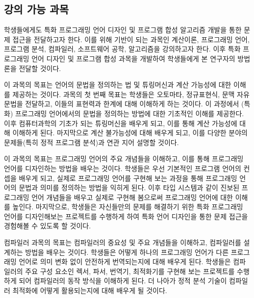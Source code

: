 \documentclass[11pt]{article}
\newcommand{\myparagraph}[1]{\medskip\noindent{\it \textbf{#1.}}}
\begin{document}
\begin{spacing}{1.145}
\section{강의 가능 과목}
학생들에게도 특화 프로그래밍 언어 디자인 및 프로그램 합성 알고리즘 개발을 통한 문제 접근을 전달하고자 한다.
%
이를 위해 기반이 되는 과목인 계산이론, 프로그래밍 언어, 프로그램 분석, 컴파일러, 소프트웨어 공학, 알고리즘을 강의하고자 한다.
%
이후 특화 프로그래밍 언어 디자인 및 프로그램 합성 과목을 개발하여 학생들에게 본 연구자의 방법론을 전달할 것이다.



\myparagraph{계산이론} 
%
이 과목의 목표는 언어의 문법을 정의하는 법 및 튜링머신과 계산 가능성에 대한 이해를 제공하는 것이다. 
%
과목의 첫 번째 목표는 학생들은 오토마타, 정규표현식, 문맥 자유 문법을 전달하고, 이들의 표현력과 한계에 대해 이해하게 하는 것이다.
%
이 과정에서 (특화) 프로그래밍 언어에서의 문법을 정의하는 방법에 대한 기초적인 이해를 제공한다.
%
이후 컴퓨터과학의 기초가 되는 튜링머신을 배우게 되고, 이를 통해 계산 가능성에 대해 이해하게 된다.
%
마지막으로 계산 불가능성에 대해 배우게 되고, 이를 다양한 분야의 문제들(특히 정적 프로그램 분석)과 연관 지어 설명할 것이다.



\myparagraph{프로그래밍 언어}
%
이 과목의 목표는 프로그래밍 언어의 주요 개념들을 이해하고, 이를 통해 프로그래밍 언어를 디자인하는 방법을 배우는 것이다.
%
학생들은 우선 기본적인 프로그램 언어의 컨셉을 배우게 되고, 실제로 프로그래밍 언어를 구현해 보는 과정을 통해 프로그래밍 언어의 문법과 의미를 정의하는 방법을 익히게 된다.
%
이후 타입 시스템과 같이 진보된 프로그래밍 언어 개념들을 배우고 실제로 구현해 봄으로써 프로그래밍 언어에 대한 이해를 높인다.
%
마지막으로, 학생들은 자신들만의 문제를 해결하기 위한 특화 프로그래밍 언어를 디자인해보는 프로젝트를 수행하게 하여 특화 언어 디자인을 통한 문제 접근을 경험해볼 수 있도록 할 것이다.






\myparagraph{컴파일러}
%
컴파일러 과목의 목표는 컴파일러의 중요성 및 주요 개념들을 이해하고, 컴파일러를 설계하는 방법을 배우는 것이다.
%
학생들은 어떻게 하나의 프로그래밍 언어가 다른 프로그래밍 언어로 의미 변화 없이 안전하게 번역되는지에 대해 배우게 된다.
%
학생들은 컴파일러의 주요 구성 요소인 렉서, 파서, 번역기, 최적화기를 구현해 보는 프로젝트를 수행하게 되어 컴파일러의 동작 방식을 이해하게 된다.
%
더 나아가 정적 분석 기술이 컴파일러 최적화에 어떻게 활용되는지에 대해 배우게 될 것이다.




\end{spacing}
\end{document}
